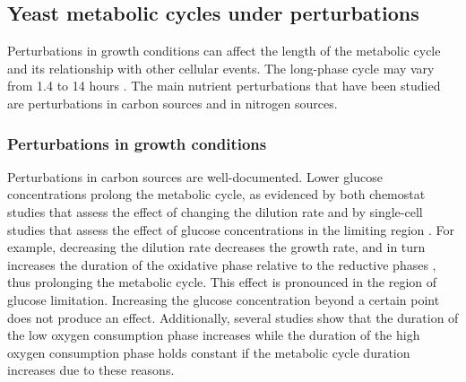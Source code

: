 \subsection{Yeast metabolic cycles under perturbations}
\label{subsec:intro-ymc-perturbations}

Perturbations in growth conditions can affect the length of the metabolic cycle and its relationship with other cellular events.
The long-phase cycle may vary from 1.4 to 14 hours \citep{caustonMetabolicRhythmsFramework2018}.
The main nutrient perturbations that have been studied are perturbations in carbon sources and in nitrogen sources.

\subsubsection{Perturbations in growth conditions}
\label{subsubsec:intro-ymc-perturbations-nutrient}


Perturbations in carbon sources are well-documented.
Lower glucose concentrations prolong the metabolic cycle, as evidenced by both chemostat studies that assess the effect of changing the dilution rate \parencite{burnettiCellCycleStart2016, oneillEukaryoticCellBiology2020} and by single-cell studies that assess the effect of glucose concentrations in the limiting region \parencite{papagiannakisAutonomousMetabolicOscillations2017}.
For example, decreasing the dilution rate decreases the growth rate, and in turn increases the duration of the oxidative phase relative to the reductive phases \citep{slavovCouplingGrowthRate2011}, thus prolonging the metabolic cycle.
This effect is pronounced in the region of glucose limitation.
Increasing the glucose concentration beyond a certain point does not produce an effect.
Additionally, several studies \citep{slavovCouplingGrowthRate2011,oneillEukaryoticCellBiology2020} show that the duration of the low oxygen consumption phase increases while the duration of the high oxygen consumption phase holds constant if the metabolic cycle duration increases due to these reasons.

